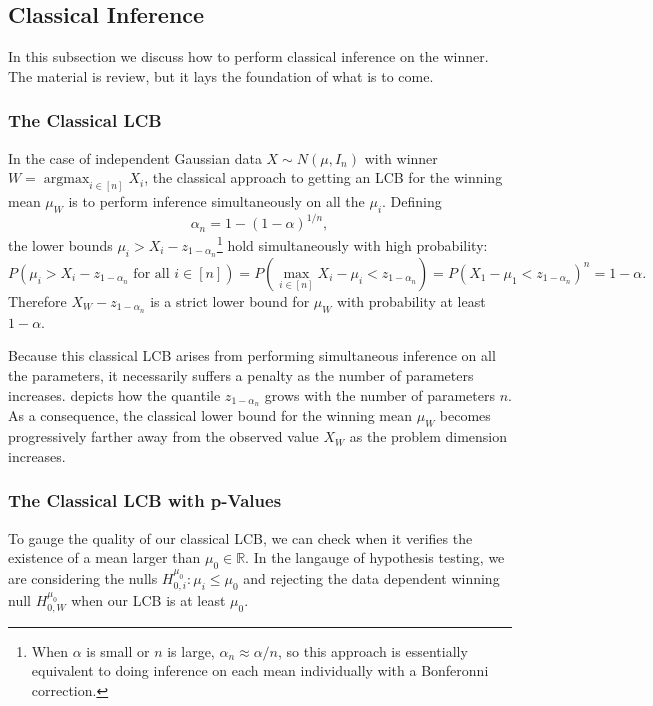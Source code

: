 \documentclass{article}
\DeclareMathOperator*{\argmax}{argmax}
\newcommand{\R}{\mathbb{R}}
\begin{document}
\subsection{Classical Inference}

In this subsection we discuss how to perform classical inference on the winner. The material is review, but it lays the foundation of what is to come. 

\subsubsection{The Classical LCB}

In the case of independent Gaussian data $X \sim N(\mu, I_n)$ with winner $W = \argmax_{i \in [n]} X_i$, the classical approach to getting an LCB for the winning mean $\mu_W$ is to perform inference simultaneously on all the $\mu_i$. Defining 
\begin{equation}
    \label{eq:bonf_quantile}
    \alpha_n = 1 - (1-\alpha)^{1/n}, 
\end{equation}
the lower bounds $ \mu_i > X_i - z_{1 - \alpha_n}$\footnote{When $\alpha$ is small or $n$ is large, $\alpha_n \approx \alpha/n$, so this approach is essentially equivalent to doing inference on each mean individually with a Bonferonni correction. } hold simultaneously with high probability:
\begin{equation*}
    P(\mu_i > X_i - z_{1- \alpha_n} \text{ for all } i \in [n]) = P( \max_{i \in [n] }X_i - \mu_i < z_{1-\alpha_n} ) = P( X_1 - \mu_1 <  z_{1-\alpha_n} )^n  = 1-\alpha.  
\end{equation*}
Therefore $X_W - z_{1-\alpha_n}$ is a strict lower bound for $\mu_{W}$ with probability at least $1-\alpha$. 

Because this classical LCB arises from performing simultaneous inference on all the parameters, it necessarily suffers a penalty as the number of parameters increases.  depicts how the quantile $z_{1-\alpha_n}$ grows with the number of parameters $n$. As a consequence, the classical lower bound for the winning mean $\mu_{W}$ becomes progressively farther away from the observed value $X_{W}$ as the problem dimension increases.  

\subsubsection{The Classical LCB with p-Values}

To gauge the quality of our classical LCB, we can check when it verifies the existence of a mean larger than $\mu_0 \in \R$. In the langauge of hypothesis testing, we are considering the nulls $H^{\mu_0}_{0, i} : \mu_i \leq \mu_0$ and rejecting the data dependent winning null $H^{\mu_0}_{0, W}$ when our LCB is at least $\mu_0$. 
\end{document}
